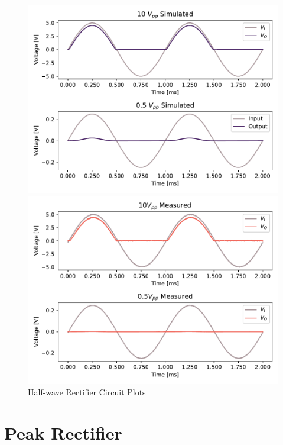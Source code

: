 \documentclass{../../ece-report}
\begin{document}
\begin{figure}[h!]
  \centering
  \begin{minipage}{.45\textwidth}
    \includegraphics[width=\textwidth]{../figures/half-wave/half-wave-sim.pdf}
  \end{minipage}
  \begin{minipage}{.45\textwidth}
    \includegraphics[width=\textwidth]{../figures/half-wave/half-wave-measured.pdf}
  \end{minipage}
  \caption{Half-wave Rectifier Circuit Plots}
  \label{fig:half_wave_plots}
\end{figure}

\section{Peak Rectifier}
\end{document}
